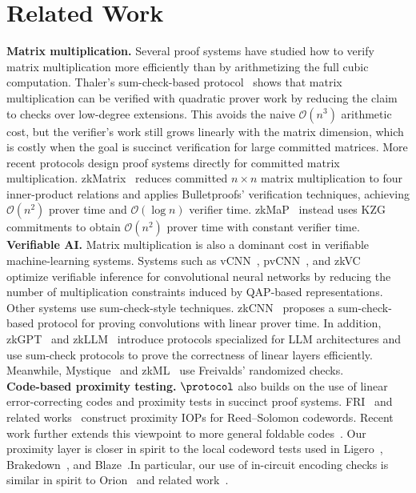 \section{Related Work}
\label{sec:related}

\noindent\textbf{Matrix multiplication.}
Several proof systems have studied how to verify matrix multiplication more
efficiently than by arithmetizing the full cubic computation. Thaler's
sum-check-based protocol~\cite{thaler2013time} shows that matrix multiplication
can be verified with quadratic prover work by reducing the claim to checks over
low-degree extensions. This avoids the naive \(\mathcal{O}(n^3)\) arithmetic
cost, but the verifier's work still grows linearly with the matrix dimension,
which is costly when the goal is succinct verification for large committed
matrices.
More recent protocols design proof systems directly for committed matrix
multiplication. zkMatrix~\cite{cong2024zkmatrix} reduces committed
\(n\times n\) matrix multiplication to four inner-product relations and applies
Bulletproofs' verification techniques, achieving \(\mathcal{O}(n^2)\)
prover time and \(\mathcal{O}(\log n)\) verifier time. zkMaP~\cite{zkMaP}
instead uses KZG commitments to obtain \(\mathcal{O}(n^2)\) prover time with
constant verifier time. \\

\noindent\textbf{Verifiable AI.}
Matrix multiplication is also a dominant cost in verifiable machine-learning
systems. Systems such as vCNN~\cite{lee2024vcnn}, pvCNN~\cite{pvCNN}, and
zkVC~\cite{zhang2025zkvc} optimize verifiable inference for convolutional neural
networks by reducing the number of multiplication constraints induced by
QAP-based representations. Other systems use sum-check-style techniques.
zkCNN~\cite{liu2021zkcnn} proposes a sum-check-based protocol for proving
convolutions with linear prover time. In addition, zkGPT~\cite{zkGPT} and
zkLLM~\cite{zkLLM} introduce protocols specialized for LLM architectures and
use sum-check protocols to prove the correctness of linear layers efficiently.
Meanwhile, Mystique~\cite{weng2021mystique} and zkML~\cite{chen2024zkml} use
Freivalds' randomized checks. \\

\noindent\textbf{Code-based proximity testing.}
\(\protocol\) also builds on the use of linear error-correcting codes and proximity
tests in succinct proof systems. FRI~\cite{FRI} and related
works~\cite{STIR,WHIR} construct proximity IOPs for
Reed--Solomon codewords. Recent work further extends this viewpoint to more
general foldable codes~\cite{basefold}.
Our proximity layer is closer in spirit to the local codeword tests used in
Ligero~\cite{Ligero}, Brakedown~\cite{brakedown}, and
Blaze~\cite{blaze}.In particular, our use of in-circuit encoding checks is similar in spirit to Orion~\cite{orion} and related work~\cite{restoring_orion}.

